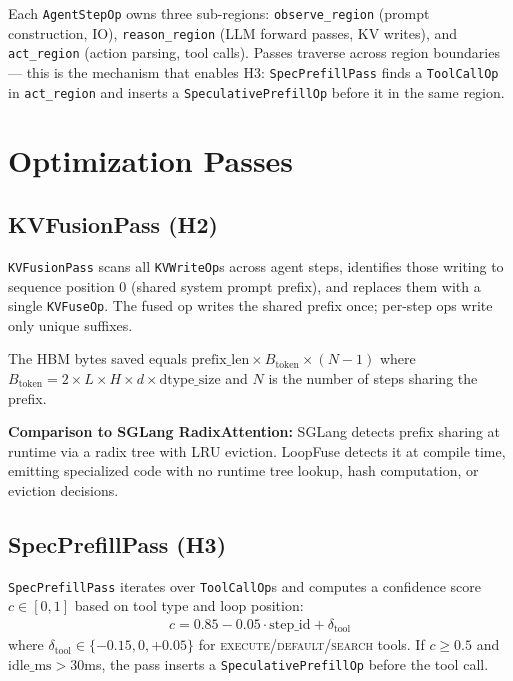 \documentclass[10pt,twocolumn]{article}
\begin{document}
Each \texttt{AgentStepOp} owns three sub-regions:
\texttt{observe\_region} (prompt construction, IO), \texttt{reason\_region}
(LLM forward passes, KV writes), and \texttt{act\_region} (action parsing,
tool calls). Passes traverse across region boundaries — this is the mechanism
that enables H3: \texttt{SpecPrefillPass} finds a \texttt{ToolCallOp} in
\texttt{act\_region} and inserts a \texttt{SpeculativePrefillOp} before it
in the same region.

\section{Optimization Passes}
\label{sec:passes}

\subsection{KVFusionPass (H2)}
\label{sec:kv-fusion}

\texttt{KVFusionPass} scans all \texttt{KVWriteOp}s across agent steps,
identifies those writing to sequence position 0 (shared system prompt prefix),
and replaces them with a single \texttt{KVFuseOp}. The fused op writes the
shared prefix once; per-step ops write only unique suffixes.

The HBM bytes saved equals $\text{prefix\_len} \times B_{\text{token}} \times (N-1)$
where $B_{\text{token}} = 2 \times L \times H \times d \times \text{dtype\_size}$
and $N$ is the number of steps sharing the prefix.

\textbf{Comparison to SGLang RadixAttention:} SGLang detects prefix sharing at
runtime via a radix tree with LRU eviction. LoopFuse detects it at compile time,
emitting specialized code with no runtime tree lookup, hash computation, or
eviction decisions.

\subsection{SpecPrefillPass (H3)}
\label{sec:spec}

\texttt{SpecPrefillPass} iterates over \texttt{ToolCallOp}s and computes
a confidence score $c \in [0,1]$ based on tool type and loop position:
\begin{align}
c = 0.85 - 0.05 \cdot \text{step\_id} + \delta_{\text{tool}}
\end{align}
where $\delta_{\text{tool}} \in \{-0.15, 0, +0.05\}$ for
\textsc{execute}/\textsc{default}/\textsc{search} tools.
If $c \geq 0.5$ and $\text{idle\_ms} > 30$ms, the pass inserts a
\texttt{SpeculativePrefillOp} before the tool call.
\end{document}
